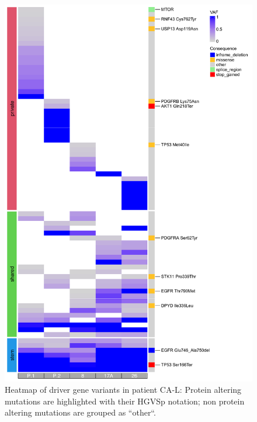 \begin{figure}[ht]
\centering
\includegraphics[width=.99\linewidth]{Figures/CASCADE/CA86/CA86varHeatmap.pdf}
\caption[Heatmap of driver gene variants in patient CA-L]{Heatmap of driver gene variants in patient CA-L: Protein altering mutations are highlighted with their HGVSp notation; non protein altering mutations are grouped as ``other``.} \label{fig:ca86heatmap}
\end{figure}


